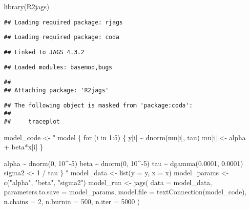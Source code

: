 \documentclass[
  oneside]{book}
\newenvironment{Shaded}{\begin{snugshade}}{\end{snugshade}}
\newcommand{\AttributeTok}[1]{\textcolor[rgb]{0.77,0.63,0.00}{#1}}
\newcommand{\DecValTok}[1]{\textcolor[rgb]{0.00,0.00,0.81}{#1}}
\newcommand{\FunctionTok}[1]{\textcolor[rgb]{0.00,0.00,0.00}{#1}}
\newcommand{\NormalTok}[1]{#1}
\newcommand{\OtherTok}[1]{\textcolor[rgb]{0.56,0.35,0.01}{#1}}
\newcommand{\StringTok}[1]{\textcolor[rgb]{0.31,0.60,0.02}{#1}}
\begin{document}
\begin{Shaded}
\begin{Highlighting}[]
\FunctionTok{library}\NormalTok{(R2jags)}
\end{Highlighting}
\end{Shaded}

\begin{verbatim}
## Loading required package: rjags
\end{verbatim}

\begin{verbatim}
## Loading required package: coda
\end{verbatim}

\begin{verbatim}
## Linked to JAGS 4.3.2
\end{verbatim}

\begin{verbatim}
## Loaded modules: basemod,bugs
\end{verbatim}

\begin{verbatim}
## 
## Attaching package: 'R2jags'
\end{verbatim}

\begin{verbatim}
## The following object is masked from 'package:coda':
## 
##     traceplot
\end{verbatim}

\begin{Shaded}
\begin{Highlighting}[]
\NormalTok{model\_code }\OtherTok{\textless{}{-}} \StringTok{"}
\StringTok{model \{}
\StringTok{  for (i in 1:5) \{}
\StringTok{    y[i] \textasciitilde{} dnorm(mu[i], tau)}
\StringTok{    mu[i] \textless{}{-} alpha + beta*x[i]}
\StringTok{  \}}

\StringTok{  alpha \textasciitilde{} dnorm(0, 10\^{}{-}5)}
\StringTok{  beta \textasciitilde{} dnorm(0, 10\^{}{-}5)}
\StringTok{  tau \textasciitilde{} dgamma(0.0001, 0.0001)}
\StringTok{  sigma2 \textless{}{-} 1 / tau}
\StringTok{\}}
\StringTok{"}
\NormalTok{model\_data }\OtherTok{\textless{}{-}} \FunctionTok{list}\NormalTok{(}\AttributeTok{y =}\NormalTok{ y, }\AttributeTok{x =}\NormalTok{ x)}
\NormalTok{model\_params }\OtherTok{\textless{}{-}} \FunctionTok{c}\NormalTok{(}\StringTok{"alpha"}\NormalTok{, }\StringTok{"beta"}\NormalTok{, }\StringTok{"sigma2"}\NormalTok{)}
\NormalTok{model\_run }\OtherTok{\textless{}{-}} \FunctionTok{jags}\NormalTok{(}
  \AttributeTok{data =}\NormalTok{ model\_data,}
  \AttributeTok{parameters.to.save =}\NormalTok{ model\_params,}
  \AttributeTok{model.file =} \FunctionTok{textConnection}\NormalTok{(model\_code),}
  \AttributeTok{n.chains =} \DecValTok{2}\NormalTok{, }\AttributeTok{n.burnin =} \DecValTok{500}\NormalTok{, }\AttributeTok{n.iter =} \DecValTok{5000}
\NormalTok{)}
\end{Highlighting}
\end{Shaded}
\end{document}

